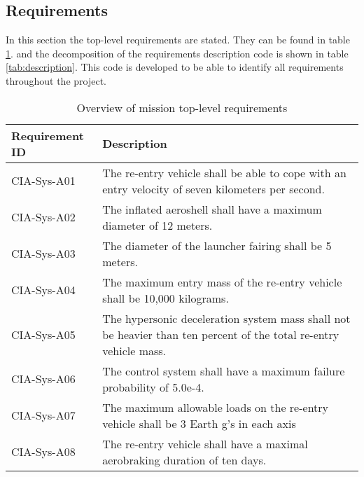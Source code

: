 \subsection{Requirements} \label{subsec:systemrequirements}
In this section the top-level requirements are stated. They can be found in table \ref{tab:requirements}. and the decomposition of the requirements description code is shown in table \ref{tab:description}. This code is developed to be able to identify all requirements throughout the project.

\begin{table}[H]
	\caption{Overview of mission top-level requirements}
	\begin{tabular}{|p{}|p{}|}
    \hline
    Requirement ID          & Description                                                                                                      \\ \hline \hline
    CIA-Sys-A01 & The re-entry vehicle shall be able to cope with an entry velocity of seven kilometers per second.                \\ \hline
    CIA-Sys-A02 & The inflated aeroshell shall have a maximum diameter of 12 meters.                                               \\ \hline
    CIA-Sys-A03 & The diameter of the launcher fairing shall be 5 meters.                                                          \\ \hline
    CIA-Sys-A04 & The maximum entry mass of the re-entry vehicle shall be 10,000 kilograms.                                         \\ \hline
    CIA-Sys-A05 & The hypersonic deceleration system mass shall not be heavier than ten percent of the total re-entry vehicle mass. \\ \hline
    CIA-Sys-A06 & The control system shall have a maximum failure probability of 5.0e-4.                                           \\ \hline
    CIA-Sys-A07 & The maximum allowable loads on the re-entry vehicle shall be 3 Earth g's in each axis                            \\ \hline
    CIA-Sys-A08 & The re-entry vehicle shall have a maximal aerobraking duration of ten days.                                      \\ \hline
    \end{tabular}
    \label{tab:requirements}
\end{table}

